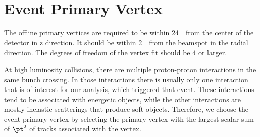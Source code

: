 %

\section{ Event Primary Vertex }

The offline primary vertices are required to be within 24~\cm\ from the center of the 
detector%
in z direction. 
It should be within 2~\cm\ from the beamspot in the radial direction. 
The degrees of freedom of the vertex fit should be 4 or larger. 

At high luminosity collisions, there are multiple proton-proton interactions 
in the same bunch crossing. In those interactions there is usually 
only one interaction that is of interest for our analysis, which triggered that event. 
These interactions tend to be associated with energetic objects, 
while the other interactions are mostly inelastic scatterings that produce soft objects.
Therefore, we choose the event primary vertex by selecting the primary vertex 
with the largest scalar sum of $\pt^2$ of tracks associated with the vertex. 




